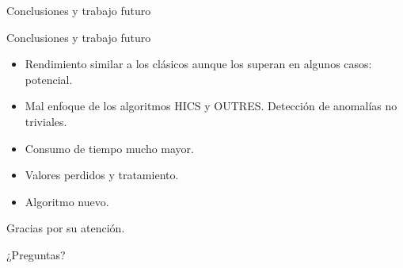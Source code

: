 \documentclass[10pt]{beamer}
\begin{document}
\begin{frame}[fragile]{Conclusiones y trabajo futuro}
\vspace{10px}

\begin{block}{Conclusiones y trabajo futuro}
	\begin{itemize}
		\item Rendimiento similar a los clásicos aunque los superan en algunos casos: potencial.
		\pause
		\item Mal enfoque de los algoritmos HICS y OUTRES. Detección de anomalías no triviales.
		\pause
		\item Consumo de tiempo mucho mayor.
		\pause
		\item Valores perdidos y tratamiento.
		\pause
		\item Algoritmo nuevo.
	\end{itemize}
\end{block}

\end{frame}


\begin{frame}[standout]
	\LARGE{Gracias por su atención.}
	
	\vspace{10px}
	
	\LARGE{¿Preguntas?}
	\vspace{10px}
\end{frame}
\end{document}
